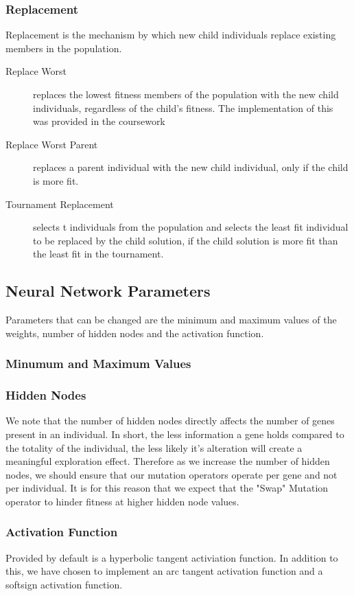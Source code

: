 \documentclass[sigconf]{acmart}
\begin{document}
\subsubsection{Replacement}
Replacement is the mechanism by which new child individuals replace existing members in the population.
\begin{description}
\item[Replace Worst] replaces the lowest fitness members of the population with the new child individuals, regardless of the child's fitness. The implementation of this was provided in the coursework
\item[Replace Worst Parent] replaces a parent individual with the new child individual, only if the child is more fit.
\item[Tournament Replacement] selects t individuals from the population and selects the least fit individual to be replaced by the child solution, if the child solution is more fit than the least fit in the tournament.

\end{description}

\subsection{Neural Network Parameters}
Parameters that can be changed are the minimum and maximum values of the weights, number of hidden nodes and the activation function.

\subsubsection{Minumum and Maximum Values}

\subsubsection{Hidden Nodes}
We note that the number of hidden nodes directly affects the number of genes present in an individual. In short, the less information a gene holds compared to the totality of the individual, the less likely it's alteration will create a meaningful exploration effect. Therefore as we increase the number of hidden nodes, we should ensure that our mutation operators operate per gene and not per individual. It is for this reason that we expect that the "Swap" Mutation operator to hinder fitness at higher hidden node values.
\subsubsection{Activation Function}
Provided by default  is a hyperbolic tangent activiation function. In addition to this, we have chosen to implement an arc tangent activation function and a softsign activation function.
\end{document}
